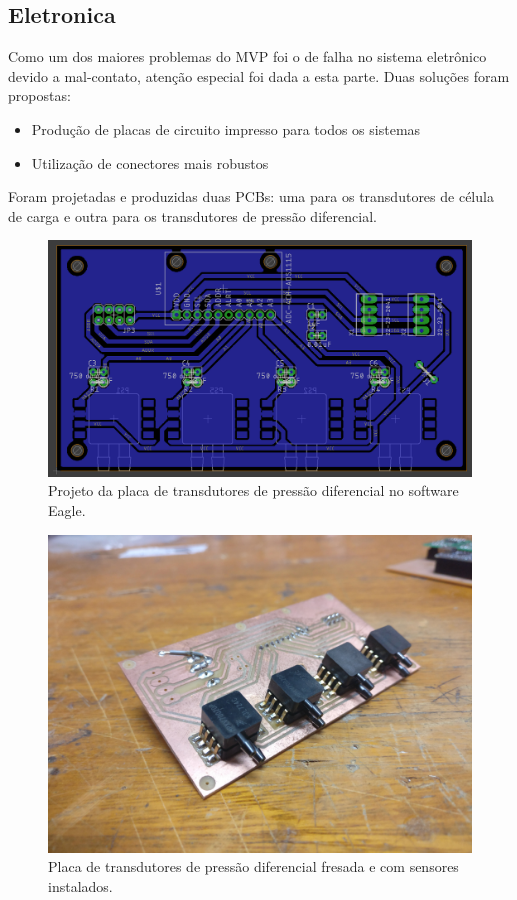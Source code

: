 \subsection{Eletronica}

Como um dos maiores problemas do MVP foi o de falha no sistema eletrônico devido a mal-contato, atenção especial foi dada a esta parte. Duas soluções foram propostas:

\begin{itemize}
    \item Produção de placas de circuito impresso para todos os sistemas
    \item Utilização de conectores mais robustos
\end{itemize}

Foram projetadas e produzidas duas PCBs: uma para os transdutores de célula de carga e outra para os transdutores de pressão diferencial.

\begin{figure}[!ht]
    \centering
    \includegraphics[width=.8\linewidth]{figuras/renders/pitot_board.png}
    \caption{Projeto da placa de transdutores de pressão diferencial no software Eagle\cite{autor}.}
    \label{fig:projeto_pcb_pitot}
\end{figure}

\begin{figure}[!ht]
    \centering
    \includegraphics[width=.8\linewidth]{figuras/construcao/pcbs_montadas_2.jpg}
    \caption{Placa de transdutores de pressão diferencial fresada e com sensores instalados\cite{autor}.}
    \label{fig:placa_pcb_pitot}
\end{figure}

